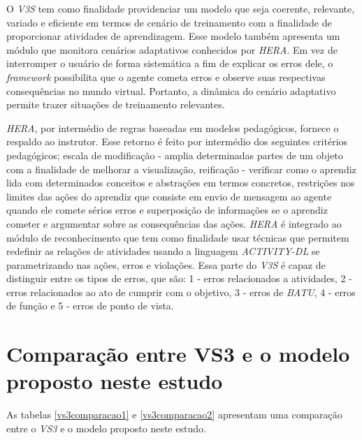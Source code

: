 O \textit{V3S} tem como finalidade providenciar um modelo que seja coerente, relevante, variado e eficiente em termos de cenário de treinamento com a finalidade de proporcionar atividades de aprendizagem. Esse modelo também apresenta um módulo que monitora cenários adaptativos conhecidos por \textit{HERA}. Em vez de interromper o usuário de forma sistemática a fim de explicar os erros dele, o \textit{framework} possibilita que o agente cometa erros e observe suas respectivas consequências no mundo virtual. Portanto, a dinâmica do cenário adaptativo permite trazer situações de treinamento relevantes. 

\textit{HERA}, por intermédio de regras baseadas em modelos pedagógicos, fornece o respaldo ao instrutor. Esse retorno é feito por intermédio dos seguintes critérios pedagógicos; escala de modificação - amplia determinadas partes de um objeto com a finalidade de melhorar a visualização, reificação - verificar como o aprendiz lida com determinados conceitos e abstrações em termos concretos, restrições nos limites das ações do aprendiz que consiste em envio de mensagem ao agente quando ele comete sérios erros e superposição de informações se o aprendiz cometer e argumentar sobre as consequências das ações. \textit{HERA} é integrado ao módulo de reconhecimento que tem como finalidade usar técnicas que permitem redefinir as relações de atividades usando a linguagem \textit{ACTIVITY-DL} se parametrizando nas ações, erros e violações. Essa parte do \textit{V3S} é capaz de distinguir entre os tipos de erros, que são: 1 - erros relacionados a atividades, 2 - erros relacionados ao ato de cumprir com o objetivo, 3 - erros de \textit{BATU}, 4 - erros de função e 5 - erros de ponto de vista.

\section{Comparação entre VS3 e o modelo proposto neste estudo}

As tabelas \ref{vs3comparacao1} e \ref{vs3comparacao2} apresentam uma comparação entre o \textit{VS3} e o modelo proposto neste estudo.

